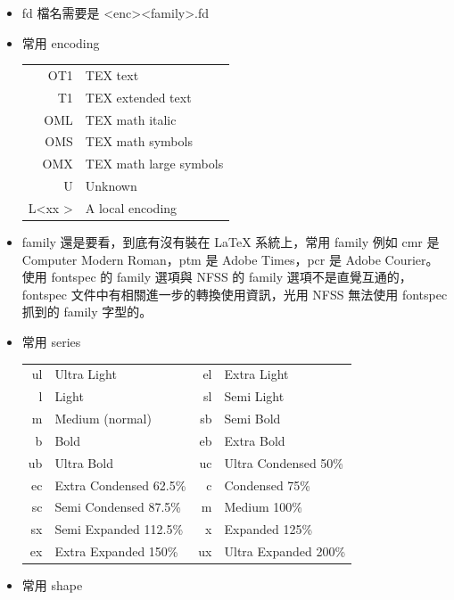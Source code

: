  \begin{itemize}
    \item fd 檔名需要是 <enc><family>.fd
    \item 常用 encoding
      \begin{center}
      \begin{tabular}{|rl|}
        \hline
        OT1 & TEX text \\
        T1  & TEX extended text \\
        OML & TEX math italic \\
        OMS & TEX math symbols \\
        OMX & TEX math large symbols \\
        U   & Unknown \\
        L<xx > & A local encoding \\
        \hline
      \end{tabular}
      \end{center}
    \item family 還是要看，到底有沒有裝在 \LaTeX{} 系統上，常用 family 例如
      cmr 是 Computer Modern Roman，ptm 是 Adobe Times，pcr 是 Adobe Courier。
      使用 fontspec 的 family 選項與 NFSS 的 family 選項不是直覺互通的，
      fontspec 文件中有相關進一步的轉換使用資訊，光用 NFSS 無法使用 fontspec
      抓到的 family 字型的。
    \item 常用 series
      \begin{center}
      \begin{tabular} {|rl|rl|}
        \hline
        ul & Ultra Light & el & Extra Light \\
        l  & Light       & sl & Semi Light \\
        m  & Medium (normal) & sb & Semi Bold \\
        b  & Bold        & eb & Extra Bold \\
        ub & Ultra Bold  & uc & Ultra Condensed 50\% \\
        ec & Extra Condensed 62.5\% & c & Condensed 75\% \\
        sc & Semi Condensed 87.5\%  & m & Medium 100\% \\
        sx & Semi Expanded 112.5\%  & x & Expanded 125\% \\
        ex & Extra Expanded 150\%   & ux & Ultra Expanded 200\% \\
        \hline
      \end{tabular}
      \end{center}
    \item 常用 shape

\end{itemize}
